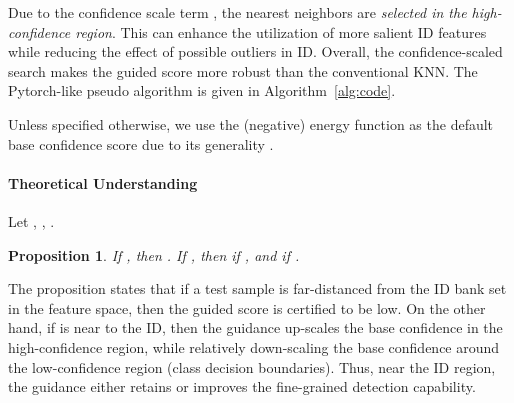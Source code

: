 \documentclass[10pt,twocolumn,letterpaper]{article}
\newtheorem{prop}[thm]{Proposition}
\begin{document}
Due to the confidence scale term , the nearest neighbors are \textit{selected in the high-confidence region}. This can enhance the utilization of more salient ID features while reducing the effect of possible outliers in ID. Overall, the confidence-scaled search makes the guided score more robust than the conventional KNN. The Pytorch-like pseudo algorithm is given in Algorithm~\ref{alg:code}.

Unless specified otherwise, we use the (negative) energy  function  as the default base confidence score  due to its generality \cite{liu2020energy}.

\paragraph{Theoretical Understanding}
Let , , .






\begin{prop}
\label{thm:theory}
If , then . If , then  if , and  if .
\end{prop}

The proposition states that if a test sample  is far-distanced from the ID bank set in the feature space, then the guided score is certified to be low. On the other hand, if  is near to the ID, then the guidance up-scales the base confidence in the high-confidence region, while relatively down-scaling the base confidence around the low-confidence region (\eg class decision boundaries).
Thus, near the ID region, the guidance either retains or improves the fine-grained detection capability.
\end{document}
